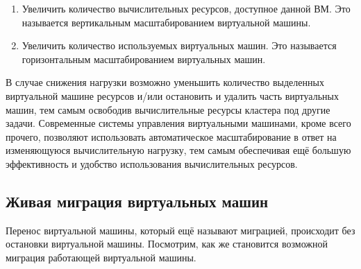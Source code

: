 \documentclass[14pt, a4paper]{article}
\begin{document}
\begin{enumerate}
    \item Увеличить количество вычислительных ресурсов, доступное данной ВМ. Это называется
    вертикальным масштабированием виртуальной машины.
    \begin{figure}[h]%
        \label{1.8} %
    \end{figure}
    \item Увеличить количество используемых виртуальных машин. Это называется горизонтальным
    масштабированием виртуальных машин.
    \begin{figure}[h]%
        \label{1.9} %
    \end{figure}
\end{enumerate}

В случае снижения нагрузки возможно уменьшить количество выделенных виртуальной машине
ресурсов и/или остановить и удалить часть виртуальных машин, тем самым освободив
вычислительные ресурсы кластера под другие задачи. Современные системы управления
виртуальными машинами, кроме всего прочего, позволяют использовать автоматическое
масштабирование в ответ на изменяющуюся вычислительную нагрузку, тем самым обеспечивая ещё
большую эффективность и удобство использования вычислительных ресурсов. \\

\subsection*{Живая миграция виртуальных машин}

Перенос виртуальной машины, который ещё называют миграцией, происходит без остановки
виртуальной машины. Посмотрим, как же становится возможной миграция работающей виртуальной
машины.
\end{document}
